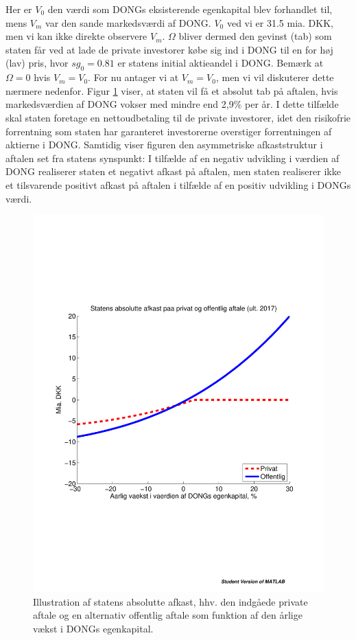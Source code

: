 \documentclass{article}
\begin{document}
Her er $V_0$ den værdi som DONGs eksisterende egenkapital blev forhandlet til, mens $V_m$ var den sande markedsværdi af DONG. $V_0$ ved vi er 31.5 mia. DKK, men vi kan ikke direkte observere $V_m$. $\Omega$ bliver dermed den gevinst (tab) som staten får ved at lade de private investorer købe sig ind i DONG til en for høj (lav) pris, hvor $sg_0=0.81$ er statens initial aktieandel i DONG. Bemærk at $\Omega=0$ hvis $V_m=V_0$. For nu antager vi at $V_m=V_0$, men vi vil diskuterer dette nærmere nedenfor. Figur \ref{fig:privat_off} viser, at staten vil få et absolut tab på aftalen, hvis markedsværdien af DONG vokser med mindre end 2,9\% per år. I dette tilfælde skal staten foretage en nettoudbetaling til de private investorer, idet den risikofrie forrentning som staten har garanteret investorerne overstiger forrentningen af aktierne i DONG. Samtidig viser figuren den asymmetriske afkaststruktur i aftalen set fra statens synspunkt: I tilfælde af en negativ udvikling i værdien af DONG realiserer staten et negativt afkast på aftalen, men staten realiserer ikke et tilsvarende positivt afkast på aftalen i tilfælde af en positiv udvikling i DONGs værdi. 

\begin{figure}
\includegraphics[scale=0.8]{../matlab/figs/private_public_deal}
\caption{Illustration af statens absolutte afkast, hhv. den indg\aa{}ede private aftale og en alternativ offentlig aftale som funktion af den \aa{}rlige v\ae{}kst i DONGs egenkapital. }
\label{fig:privat_off}
\end{figure}
\end{document}
